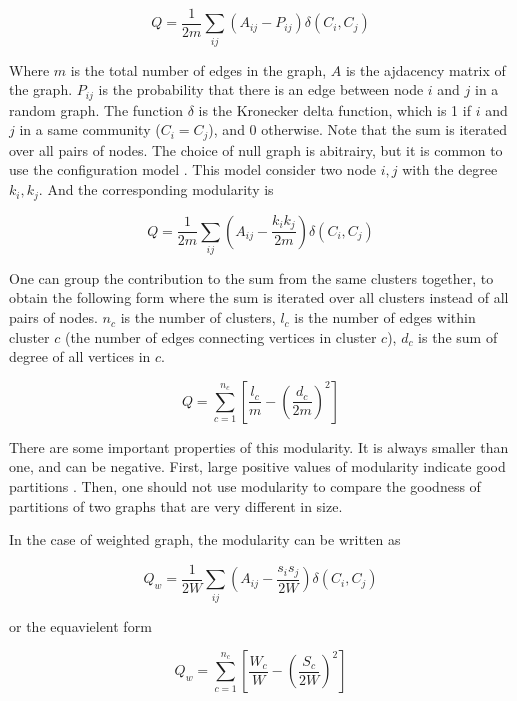 \begin{equation}
	Q = \frac{1}{2m} \sum_{ij} \left(A_{ij} - P_{ij}\right) \delta(C_i, C_j)
\end{equation}

Where $m$ is the total number of edges in the graph,
$A$ is the ajdacency matrix of the graph.
$P_{ij}$ is the probability that there is an edge between node $i$ and $j$ in a random graph.
The function $\delta$ is the Kronecker delta function,
which is 1 if $i$ and $j$ in a same community ($C_i = C_j$), and 0 otherwise.
Note that the sum is iterated over all pairs of nodes.
The choice of null graph is abitrairy, but it is common to use the configuration model \cite{newman2004}.
This model consider two node $i, j$ with the degree $k_i, k_j$.
And the corresponding modularity is

\begin{equation}
	Q = \frac{1}{2m} \sum_{ij} \left(A_{ij} - \frac{k_i k_j}{2m}\right) \delta(C_i, C_j)
\end{equation}

One can group the contribution to the sum from the same clusters together,
to obtain the following form where the sum is iterated over all clusters instead of all pairs of nodes.
$n_c$ is the number of clusters, $l_c$ is the number of edges within cluster $c$ (the number of edges connecting vertices in cluster $c$),
$d_c$ is the sum of degree of all vertices in $c$.


\begin{equation}
	Q = \sum_{c=1}^{n_c} \left[\frac{l_c}{m} - \left(\frac{d_c}{2m}\right)^2 \right]
\end{equation}

There are some important properties of this modularity.
It is always smaller than one, and can be negative.
First, large positive values of modularity indicate good partitions \cite{fortunato2010}.
Then, one should not use modularity to compare the goodness of partitions of two graphs that are very different in size.

In the case of weighted graph, the modularity can be written as

\begin{equation}
	Q_w = \frac{1}{2W} \sum_{ij} \left(A_{ij} - \frac{s_i s_j}{2W}\right) \delta(C_i, C_j)
\end{equation}

or the equavielent form

\begin{equation}
	Q_w = \sum_{c=1}^{n_c} \left[\frac{W_c}{W} - \left(\frac{S_c}{2W}\right)^2 \right]
\end{equation}

